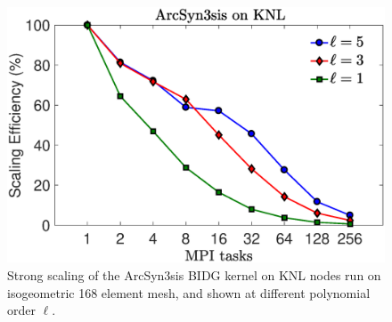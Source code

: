 \begin{figure}
\begin{center}
\includegraphics[width=0.99\linewidth]{./bidg_data/2nd_try/scaling_p}
\end{center}
\vspace*{-.5cm}
\caption{Strong scaling of the ArcSyn3sis BIDG kernel on KNL nodes run on
isogeometric 168 element mesh, and shown at different polynomial order $\ell$.}
\label{fig:bidg_scaling}
\end{figure}

 

